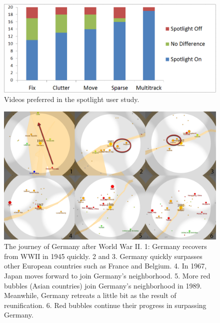\documentclass[review]{vgtc}                 %
\begin{document}
\begin{figure}[t]
\centering
\includegraphics[width=\columnwidth]{spotlight}
\caption{Videos preferred in the spotlight user study.}
\label{fig:spotlightstudy}
\end{figure}

\begin{figure}[htb]
 \centering
 \includegraphics[width=1\linewidth]{Germany}
\vspace{-0.2in}
 \caption{The journey of Germany after World War II. 1: Germany recovers from WWII in 1945 quickly. 2 and 3. Germany quickly surpasses other European countries such as France and Belgium. 4. In 1967, Japan moves forward to join Germany's neighborhood. 5. More red bubbles (Asian countries) join Germany's neighborhood in 1989. Meanwhile, Germany retreats a little bit as the result of reunification. 6. Red bubbles continue their progress in surpassing Germany.}
 \label{fig:germany}
\vspace{-0.21in}
\end{figure}
\end{document}
